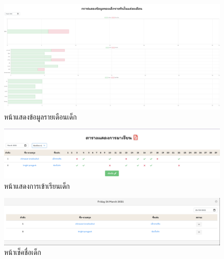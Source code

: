   \begin{figure}
    \begin{center}
    \includegraphics[width=\linewidth]{images/ChartPage.png}
    \end{center}
    \caption[หน้าแสดงข้อมูลรายเดือนเด็ก]{หน้าแสดงข้อมูลรายเดือนเด็ก}
    \label{fig:ChartPage}
  \end{figure}

  \begin{figure}
    \begin{center}
    \includegraphics[width=\linewidth]{images/Attendance.png}
    \end{center}
    \caption[หน้าแสดงการเข้าเรียนเด็ก]{หน้าแสดงการเข้าเรียนเด็ก}
    \label{fig:Attendance}
  \end{figure}



  \begin{figure}
    \begin{center}
    \includegraphics[width=\linewidth]{images/checkAttendance.png}
    \end{center}
    \caption[หน้าเช็คชื่อเด็ก]{หน้าเช็คชื่อเด็ก}
    \label{fig:CheckAttendance}
  \end{figure}

